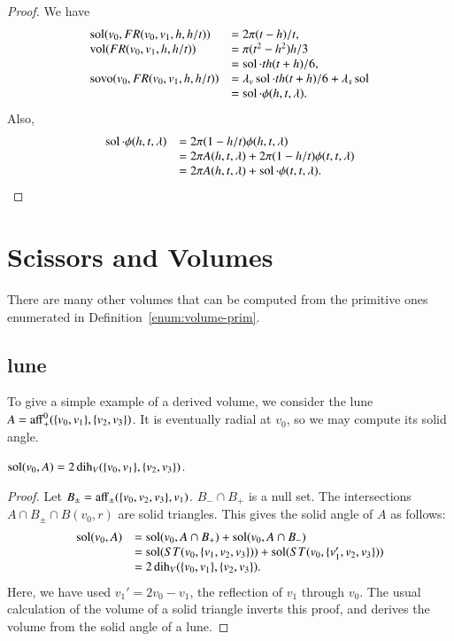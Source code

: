 \begin{proof}
We have 
  $$
  \begin{array}{lll}
  {\operatorname{sol}}(v_0,FR(v_0,v_1,h,h/t)) &= 2\pi(t-h)/t,\\
  {\operatorname{vol}}(FR(v_0,v_1,h,h/t)) &= \pi(t^2-h^2)h/3\\
      &= \operatorname{sol}\cdot t h (t+h)/6,\\
  {\operatorname{sovo}}(v_0,FR(v_0,v_1,h,h/t)) &= 
     \lambda_v \operatorname{sol}\cdot t h (t+h)/6 + \lambda_s \operatorname{sol}\\
   &= \operatorname{sol}\cdot \phi(h,t,\lambda).
  \end{array}
  $$
Also,
  $$
  \begin{array}{lll}
  \operatorname{sol}\cdot\phi(h,t,\lambda) &= 2\pi (1-h/t)\phi(h,t,\lambda)\\
  &= 2\pi A(h,t,\lambda) + 2\pi (1-h/t)\phi(t,t,\lambda)\\
  &= 2\pi A(h,t,\lambda) + \operatorname{sol}\cdot \phi(t,t,\lambda).
  \end{array}
  $$
\end{proof}

\section{Scissors and Volumes}

There are many other volumes that can be computed from the
primitive ones enumerated in Definition~\ref{enum:volume-prim}.

\subsection{lune}  

To give a simple example of a derived volume, we consider the
lune $A={\operatorname{aff}}_+^0(\{v_0,v_1\},\{v_2,v_3\})$.  It is eventually
radial at $v_0$, so we may compute its solid angle.

\begin{lemma}  $\operatorname{sol}(v_0,A) = 2\operatorname{dih}_V(\{v_0,v_1\},\{v_2,v_3\})$.
\end{lemma}

\begin{proof}
Let $B_{\pm} = {\operatorname{aff}}_\pm(\{v_0,v_2,v_3\},v_1)$.  $B_- \cap B_+$
is a null set.  The intersections $A\cap B_{\pm}\cap B(v_0,r)$ 
are solid triangles.  This gives the solid angle of $A$ as
follows:
   $$\begin{array}{lll}
   \operatorname{sol}(v_0,A) &= \operatorname{sol}(v_0,A\cap B_+)+\operatorname{sol}(v_0,A\cap B_-) \\
   &= 
   \operatorname{sol}(ST(v_0,\{v_1,v_2,v_3\})) + \operatorname{sol}(ST(v_0,\{v_1',v_2,v_3\})) \\
   &=
   2\operatorname{dih}_V(\{v_0,v_1\},\{v_2,v_3\}).
   \end{array}
   $$
Here, we have used $v_1'= 2 v_0 - v_1$, the reflection of $v_1$
through $v_0$.  The usual calculation of the volume of a solid triangle
inverts this proof, 
and derives the volume from the solid angle of a lune.
\end{proof}



